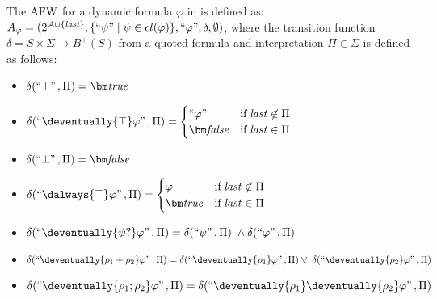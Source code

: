 \begin{definition}
    The $\mathrm{AFW}$ for a dynamic formula $\varphi$ in \nnf is defined as:
    $A_\varphi =(2^{\mathcal{A } \cup \{\mathit{last}\}},\{``\psi" \mid \psi \in cl(\varphi) \},``\varphi",\delta,\emptyset)$, where the transition function $\delta = S\times \Sigma \to B^+(S)$ from a quoted formula and interpretation $\Pi\in\Sigma$ is defined as follows: 


  \begin{multicols}{2}
    \small
    \begin{itemize}
 
      
    \item $\delta(\s{\top},\Pi)=\tpbf$
            
      \item $\delta(\s{\deventually{\top}\varphi},\Pi)=\begin{cases}
        \s{\varphi} & \text{if} \;\last\not\in \Pi \\
        \fpbf & \text{if} \;\last\in \Pi \\
      \end{cases}
      $
      

      
      \item $\delta(\s{\bot},\Pi)=\fpbf$
      
      \item $\delta(\s{\dalways{\top}\varphi},\Pi)=\begin{cases}
        \varphi & \text{if} \;\last\not\in \Pi \\
        \tpbf & \text{if} \;\last\in \Pi \\
      \end{cases}
      $

    \end{itemize}
  \end{multicols}
\begin{itemize}

          
  \item $\delta(\s{\deventually{\psi ?}\varphi},\Pi)=
  \delta(\s{\psi},\Pi) \; \wedge \delta(\s{\varphi},\Pi)
  $
  
  \item $\delta(\s{\deventually{\rho_1 + \rho_2}\varphi},\Pi)=
  \delta(\s{\deventually{\rho_1}\varphi},\Pi) \vee \; \delta(\s{\deventually{\rho_2}\varphi},\Pi)
  $
  
  \item $\delta(\s{\deventually{\rho_1 ; \rho_2}\varphi},\Pi)=
    \delta(\s{\deventually{\rho_1}\deventually{\rho_2}\varphi},\Pi)
    $


\end{itemize}
\end{definition}
